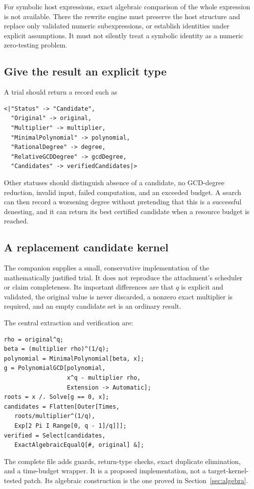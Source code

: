 \documentclass[11pt,letterpaper]{article}
\newcommand{\code}[1]{\texttt{\detokenize{#1}}}
\theoremstyle{definition}
\begin{document}
For symbolic host expressions, exact algebraic comparison of the whole expression
is not available. There the rewrite engine must preserve the host structure and
replace only validated numeric subexpressions, or establish identities under
explicit assumptions. It must not silently treat a symbolic identity as a numeric
zero-testing problem.

\subsection{Give the result an explicit type}
A trial should return a record such as
\begin{lstlisting}
<|"Status" -> "Candidate",
  "Original" -> original,
  "Multiplier" -> multiplier,
  "MinimalPolynomial" -> polynomial,
  "RationalDegree" -> degree,
  "RelativeGCDDegree" -> gcdDegree,
  "Candidates" -> verifiedCandidates|>
\end{lstlisting}
Other statuses should distinguish absence of a candidate, no GCD-degree reduction,
invalid input, failed computation, and an exceeded budget. A search can then record
a worsening degree without
pretending that this is a successful denesting, and it can return its best certified
candidate when a resource budget is reached.

\subsection{A replacement candidate kernel}
The companion \code{safe_candidate_kernel.wl} supplies a small, conservative
implementation of the mathematically justified trial. It does not reproduce the
attachment's scheduler or claim completeness. Its important differences are that
$q$ is explicit and validated, the original value is never discarded, a nonzero
exact multiplier is required, and an empty candidate set is an ordinary result.

The central extraction and verification are:
\begin{lstlisting}
rho = original^q;
beta = (multiplier rho)^(1/q);
polynomial = MinimalPolynomial[beta, x];
g = PolynomialGCD[polynomial,
                  x^q - multiplier rho,
                  Extension -> Automatic];
roots = x /. Solve[g == 0, x];
candidates = Flatten[Outer[Times,
   roots/multiplier^(1/q),
   Exp[2 Pi I Range[0, q - 1]/q]]];
verified = Select[candidates,
   ExactAlgebraicEqualQ[#, original] &];
\end{lstlisting}
The complete file adds guards, return-type checks, exact duplicate elimination, and
a time-budget wrapper. It is a proposed implementation, not a target-kernel-tested
patch. Its algebraic construction is the one proved in Section~\ref{sec:algebra}.
\end{document}

